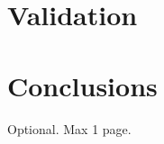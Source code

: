 \documentclass[12pt,a4paper,openright,twoside]{book}
\begin{document}
\chapter{Validation}%
\label{chap:validation}


\chapter{Conclusions}%
\label{chap:conclusions}




\backmatter





\begin{acknowledgements} %
Optional. Max 1 page.
\end{acknowledgements}
\end{document}

